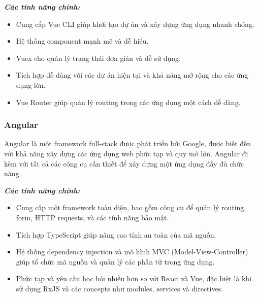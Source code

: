 \par \textbf{\textit{Các tính năng chính:}} \begin{itemize} \item Cung cấp Vue CLI giúp khởi tạo dự án và xây dựng ứng dụng nhanh chóng. \item Hệ thống component mạnh mẽ và dễ hiểu. \item Vuex cho quản lý trạng thái đơn giản và dễ sử dụng. \item Tích hợp dễ dàng với các dự án hiện tại và khả năng mở rộng cho các ứng dụng lớn. \item Vue Router giúp quản lý routing trong các ứng dụng một cách dễ dàng. \end{itemize}

\subsubsection{Angular}
Angular là một framework full-stack được phát triển bởi Google, được biết đến với khả năng xây dựng các ứng dụng web phức tạp và quy mô lớn. Angular đi kèm với tất cả các công cụ cần thiết để xây dựng một ứng dụng đầy đủ chức năng.

\par \textbf{\textit{Các tính năng chính:}} \begin{itemize} \item Cung cấp một framework toàn diện, bao gồm công cụ để quản lý routing, form, HTTP requests, và các tính năng bảo mật. \item Tích hợp TypeScript giúp nâng cao tính an toàn của mã nguồn. \item Hệ thống dependency injection và mô hình MVC (Model-View-Controller) giúp tổ chức mã nguồn và quản lý các phần tử trong ứng dụng. \item Phức tạp và yêu cầu học hỏi nhiều hơn so với React và Vue, đặc biệt là khi sử dụng RxJS và các concepts như modules, services và directives. \end{itemize}

